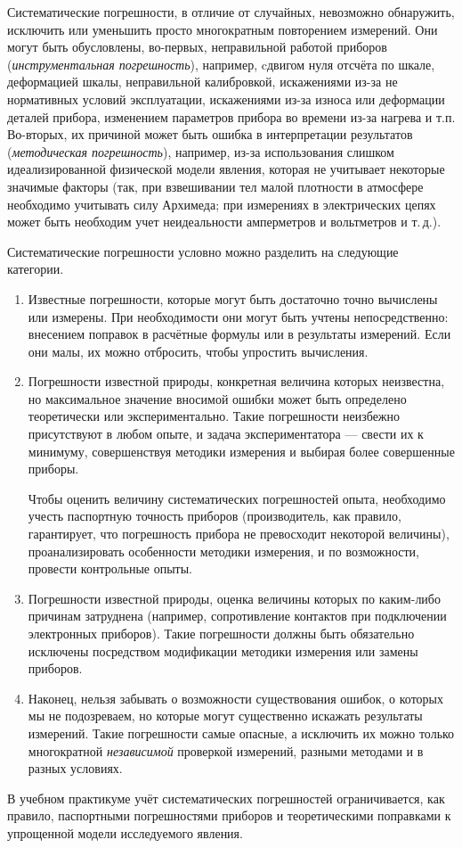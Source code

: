 Систематические погрешности, в отличие от случайных, невозможно обнаружить,
исключить или уменьшить просто многократным повторением измерений.
Они могут быть обусловлены, во-первых, неправильной работой приборов
(\emph{инструментальная погрешность}), например, cдвигом нуля отсчёта
по шкале, деформацией шкалы, неправильной калибровкой, искажениями
из-за не нормативных условий эксплуатации, искажениями из-за износа
или деформации деталей прибора, изменением параметров прибора во времени
из-за нагрева и т.п. Во-вторых, их причиной может быть ошибка в интерпретации
результатов (\emph{методическая погрешность}), например, из-за использования
слишком идеализированной физической модели явления, которая не учитывает
некоторые значимые факторы (так, при взвешивании тел малой плотности
в атмосфере необходимо учитывать силу Архимеда; при измерениях в электрических
цепях может быть необходим учет неидеальности амперметров и вольтметров
и т.\,д.).

Систематические погрешности условно можно разделить на следующие категории.

\begin{enumerate}
    \item Известные погрешности, которые могут быть достаточно точно вычислены
или измерены. При необходимости они могут быть учтены непосредственно:
внесением поправок в расчётные формулы или в результаты измерений.
Если они малы, их можно отбросить, чтобы упростить вычисления.

    \item Погрешности известной природы, конкретная величина которых неизвестна,
но максимальное значение вносимой ошибки может быть определено теоретически
или экспериментально. Такие погрешности неизбежно присутствуют в любом
опыте, и задача экспериментатора --- свести их к минимуму,
совершенствуя методики измерения и выбирая более совершенные приборы.
    
    Чтобы оценить величину систематических погрешностей опыта, необходимо
учесть паспортную точность приборов (производитель, как правило, гарантирует,
что погрешность прибора не превосходит некоторой величины), проанализировать
особенности методики измерения, и по возможности, провести контрольные
опыты.

    \item Погрешности известной природы, оценка величины которых по каким-либо
причинам затруднена (например, сопротивление контактов при подключении
электронных приборов). Такие погрешности должны быть обязательно исключены
посредством модификации методики измерения или замены приборов.

    \item Наконец, нельзя забывать о возможности существования ошибок, о
которых мы не подозреваем, но которые могут существенно искажать результаты
измерений. Такие погрешности самые опасные, а исключить их можно только
многократной \emph{независимой} проверкой измерений, разными методами
и в разных условиях.
\end{enumerate}

В учебном практикуме учёт систематических погрешностей ограничивается,
как правило, паспортными погрешностями приборов и теоретическими поправками
к упрощенной модели исследуемого явления.
